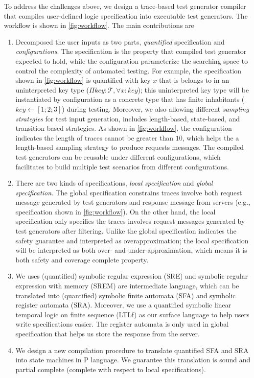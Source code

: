 To address the challenges above, we design a trace-based test generator compiler that compiles user-defined logic specification into executable test generators. The workflow is shown in \autoref{fig:workflow}. The main contributions are
\begin{enumerate}
    \item Decomposed the user inputs as two parts, \emph{quantified} specification and \emph{configurations}. The specification is the property that compiled test generator expected to hold, while the configuration parameterize the searching space to control the complexity of automated testing. For example, the specification shown in \autoref{fig:workflow} is quantified with key $x$ that is belongs to in an uninterpreted key type ($\Pi key{:}\mathcal{T}, \forall x{:}key$); this uninterpreted key type will be instantiated by configuration as a concrete type that has finite inhabitants ($key \leftarrow [1;2;3]$) during testing. Moreover, we also allowing different \emph{sampling strategies} for test input generation, includes length-based, state-based, and transition based strategies. As shown in \autoref{fig:workflow}, the configuration indicates the length of traces cannot be greater than $10$, which helps the a length-based sampling strategy to produce requests messages.
    The compiled test generators can be reusable under different configurations, which facilitates to build multiple test scenarios from different configurations.
    \item There are two kinds of specifications, \emph{local specification} and \emph{global specification}. The global specification constrains traces involve both request message generated by test generators and response message from servers (e.g., specification shown in \autoref{fig:workflow}). On the other hand, the local specification only specifies the traces involves request messages generated by test generators after filtering. Unlike the global specification indicates the safety guarantee and interpreted as overapproximation; the local specification will be interpreted as both over- and under-approximation, which means it is both safety and coverage complete property.
    \item We uses (quantified) symbolic regular expression (SRE) and symbolic regular expression with memory (SREM) are intermediate language, which can be translated into (quantified) symbolic finite automata (SFA) and symbolic register automata (SRA). Moreover, we use a quantified symbolic linear temporal logic on finite sequence (LTLf) as our surface language to help users write specifications easier. The register automata is only used in global specification that helps us store the response from the server.
    \item We design a new compilation procedure to translate quantified SFA and SRA into state machines in P language. We guarantee this translation is sound and partial complete (complete with respect to local specifications).
\end{enumerate}